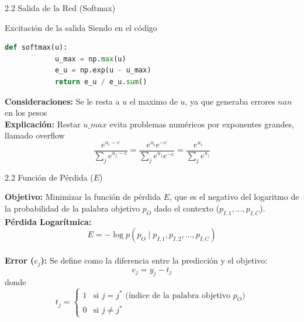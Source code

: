 \documentclass{beamer}
\begin{document}
	
\begin{frame}[fragile]{2.2 Salida de la Red (Softmax)}
	\begin{block}{Excitación de la salida}
		\justifying
		Siendo en el código
		\begin{lstlisting}[language=Python]
			def softmax(u):
			u_max = np.max(u)
			e_u = np.exp(u - u_max)
			return e_u / e_u.sum()
		\end{lstlisting}
		\textbf{ Consideraciones:} Se le resta a $u$ el maximo de $u$, ya que generaba errores $nan$ en los pesos\\
		\vspace{0.2cm}
		\textbf{ Explicación:} Restar $u\_max$ evita problemas numéricos por exponentes grandes, llamado overflow\\
		\[
		\frac{e^{u_i - c}}{\sum_j e^{u_j - c}} 
		= \frac{e^{u_i} e^{-c}}{\sum_j e^{u_j} e^{-c}} 
		= \frac{e^{u_i}}{\sum_j e^{u_j}}
		\]

	\end{block}
\end{frame}
	
	
\begin{frame}[fragile]{2.2 Función de Pérdida ($E$)}
	\begin{block}{}
		\justifying
		\textbf{Objetivo:} Minimizar la función de pérdida $E$, que es el negativo del logaritmo de la probabilidad de la palabra objetivo $p_O$ dado el contexto ($p_{I,1}, \dots, p_{I,C}$).\\[0.2cm]
		
		\textbf{Pérdida Logarítmica:} 
		\[
		E = - \log p(p_O \mid p_{I,1}, p_{I,2}, \dots, p_{I,C})
		\] \\[0.1cm]
		
		\textbf{Error ($e_j$):} Se define como la diferencia entre la predicción y el objetivo:
		\[
		e_j = y_j - t_j
		\]
		donde
		\[
		t_j =
		\begin{cases}
			1 & \text{si } j = j^* \text{ (índice de la palabra objetivo $p_O$)}\\
			0 & \text{si } j \neq j^*
		\end{cases}
		\] \\[0.1cm]
	\end{block}

\end{frame}
	
\end{document}
